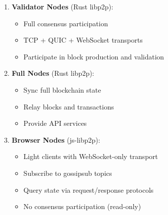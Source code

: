 \documentclass[11pt,a4paper]{article}
\begin{document}
\begin{enumerate}
    \item \textbf{Validator Nodes} (Rust libp2p):
    \begin{itemize}
        \item Full consensus participation
        \item TCP + QUIC + WebSocket transports
        \item Participate in block production and validation
    \end{itemize}

    \item \textbf{Full Nodes} (Rust libp2p):
    \begin{itemize}
        \item Sync full blockchain state
        \item Relay blocks and transactions
        \item Provide API services
    \end{itemize}

    \item \textbf{Browser Nodes} (js-libp2p):
    \begin{itemize}
        \item Light clients with WebSocket-only transport
        \item Subscribe to gossipsub topics
        \item Query state via request/response protocols
        \item No consensus participation (read-only)
    \end{itemize}
\end{enumerate}
\end{document}
